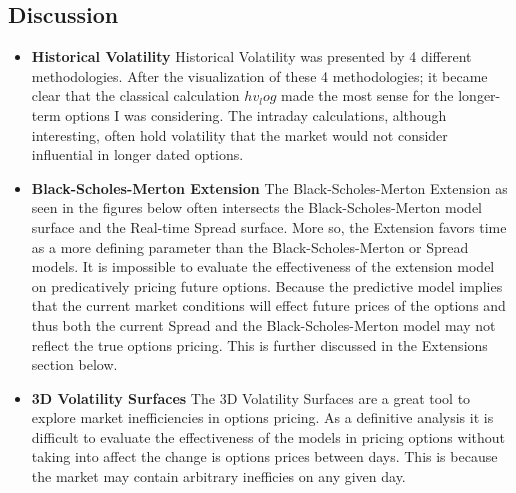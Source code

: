 \documentclass{article}
\begin{document}
\subsection{Discussion}
\begin{flushleft}{
\begin{itemize}
  \item \textbf{Historical Volatility} \newline
  \tabHorizontal Historical Volatility was presented by 4 different methodologies. After the visualization of these 4 methodologies; it became clear that the classical calculation $hv_log$ made the most sense for the longer-term options I was considering. The intraday calculations, although interesting, often hold volatility that the market would not consider influential in longer dated options. 
  \item \textbf{Black-Scholes-Merton Extension} \newline
  \tabHorizontal The Black-Scholes-Merton Extension as seen in the figures below often intersects the Black-Scholes-Merton model surface and the Real-time Spread surface. More so, the Extension favors time as a more defining parameter than the Black-Scholes-Merton or Spread models. It is impossible to evaluate the effectiveness of the extension model on predicatively pricing future options. Because the predictive model implies that the current market conditions will effect future prices of the options and thus both the current Spread and the Black-Scholes-Merton model may not reflect the true options pricing. This is further discussed in the Extensions section below. 
  \item \textbf{3D Volatility Surfaces} \newline
  \tabHorizontal The 3D Volatility Surfaces are a great tool to explore market inefficiencies in options pricing. As a definitive analysis it is difficult to evaluate the effectiveness of the models in pricing options without taking into affect the change is options prices between days. This is because the market may contain arbitrary inefficies on any given day. 
\end{itemize}
} 
\end{flushleft}
\end{document}
